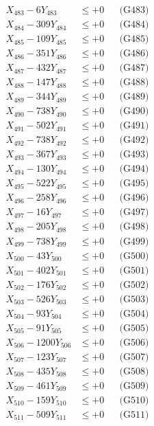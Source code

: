 \documentclass[a4paper,10pt]{article}
\begin{document}
{\begin{align}
X_{483} - 6Y_{483} &\leq +0 && \text{(G483)} \\
X_{484} - 309Y_{484} &\leq +0 && \text{(G484)} \\
X_{485} - 109Y_{485} &\leq +0 && \text{(G485)} \\
X_{486} - 351Y_{486} &\leq +0 && \text{(G486)} \\
X_{487} - 432Y_{487} &\leq +0 && \text{(G487)} \\
X_{488} - 147Y_{488} &\leq +0 && \text{(G488)} \\
X_{489} - 344Y_{489} &\leq +0 && \text{(G489)} \\
X_{490} - 738Y_{490} &\leq +0 && \text{(G490)} \\
\allowbreak
X_{491} - 502Y_{491} &\leq +0 && \text{(G491)} \\
X_{492} - 738Y_{492} &\leq +0 && \text{(G492)} \\
X_{493} - 367Y_{493} &\leq +0 && \text{(G493)} \\
X_{494} - 130Y_{494} &\leq +0 && \text{(G494)} \\
X_{495} - 522Y_{495} &\leq +0 && \text{(G495)} \\
X_{496} - 258Y_{496} &\leq +0 && \text{(G496)} \\
X_{497} - 16Y_{497} &\leq +0 && \text{(G497)} \\
X_{498} - 205Y_{498} &\leq +0 && \text{(G498)} \\
X_{499} - 738Y_{499} &\leq +0 && \text{(G499)} \\
X_{500} - 43Y_{500} &\leq +0 && \text{(G500)} \\
\allowbreak
X_{501} - 402Y_{501} &\leq +0 && \text{(G501)} \\
X_{502} - 176Y_{502} &\leq +0 && \text{(G502)} \\
X_{503} - 526Y_{503} &\leq +0 && \text{(G503)} \\
X_{504} - 93Y_{504} &\leq +0 && \text{(G504)} \\
X_{505} - 91Y_{505} &\leq +0 && \text{(G505)} \\
X_{506} - 1200Y_{506} &\leq +0 && \text{(G506)} \\
X_{507} - 123Y_{507} &\leq +0 && \text{(G507)} \\
X_{508} - 435Y_{508} &\leq +0 && \text{(G508)} \\
X_{509} - 461Y_{509} &\leq +0 && \text{(G509)} \\
X_{510} - 159Y_{510} &\leq +0 && \text{(G510)} \\
\allowbreak
X_{511} - 509Y_{511} &\leq +0 && \text{(G511)} \\

\end{align}}
\end{document}
